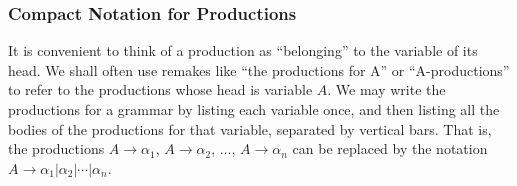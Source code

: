 \documentclass[]{article}
\begin{document}
      \subsubsection*{Compact Notation for Productions}
        It is convenient to think of a production as ``belonging'' to the
        variable of its head. We shall often use remakes like ``the productions
        for A'' or ``A-productions'' to refer to the productions whose head is
        variable $A$. We may write the productions for a grammar by listing each
        variable once, and then listing all the bodies of the productions for
        that variable, separated by vertical bars. That is, the productions $A
        \rightarrow \alpha_1$, $A \rightarrow \alpha_2$, $\ldots$, $A
        \rightarrow \alpha_n$ can be replaced by the notation $A \rightarrow
        \alpha_1 | \alpha_2 | \cdots | \alpha_n$.
\end{document}
